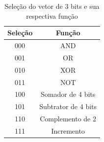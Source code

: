 \documentclass[a4paper,12pt,twoside]{article}
\begin{document}
\begin{table}[H]
\begin{tabular}{|c||c|} \hline
Seleção & Função \\\hline
000 & AND \\\hline
001 & OR\\\hline
010 & XOR\\\hline
011 & NOT \\\hline
100 & Somador de 4 bits \\\hline
101 & Subtrator de 4 bits \\\hline
110 & Complemento de 2 \\\hline
111 & Incremento \\\hline

\end{tabular}
\label{tabela1}
\centering
\caption{Seleção do vetor de 3 bits e sua respectiva função}
\label {tabela1}
\end{table}
\end{document}
